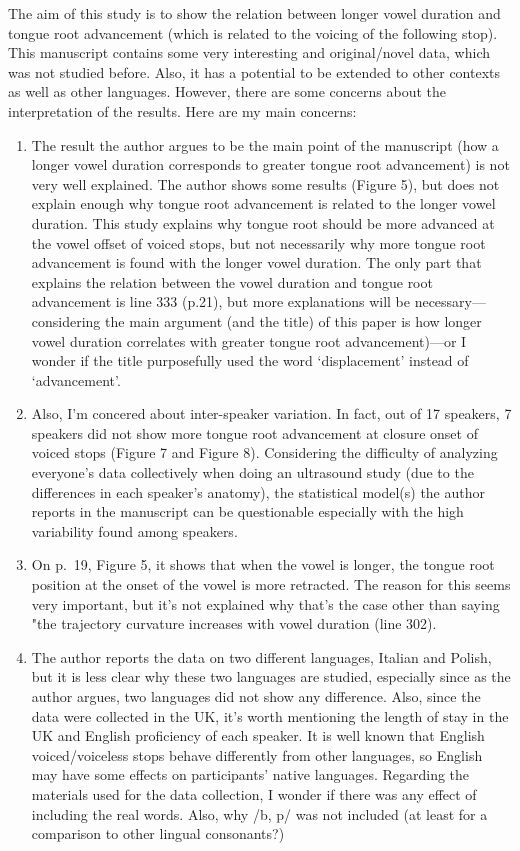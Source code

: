 \documentclass[]{article}
\begin{document}
The aim of this study is to show the relation between longer vowel
duration and tongue root advancement (which is related to the voicing of
the following stop). This manuscript contains some very interesting and
original/novel data, which was not studied before. Also, it has a
potential to be extended to other contexts as well as other languages.
However, there are some concerns about the interpretation of the
results. Here are my main concerns:

\begin{enumerate}
\def\labelenumi{\arabic{enumi}.}
\item
  The result the author argues to be the main point of the manuscript
  (how a longer vowel duration corresponds to greater tongue root
  advancement) is not very well explained. The author shows some results
  (Figure 5), but does not explain enough why tongue root advancement is
  related to the longer vowel duration. This study explains why tongue
  root should be more advanced at the vowel offset of voiced stops, but
  not necessarily why more tongue root advancement is found with the
  longer vowel duration. The only part that explains the relation
  between the vowel duration and tongue root advancement is line 333
  (p.21), but more explanations will be necessary---considering the main
  argument (and the title) of this paper is how longer vowel duration
  correlates with greater tongue root advancement)---or I wonder if the
  title purposefully used the word `displacement' instead of
  `advancement'.
\item
  Also, I'm concered about inter-speaker variation. In fact, out of 17
  speakers, 7 speakers did not show more tongue root advancement at
  closure onset of voiced stops (Figure 7 and Figure 8). Considering the
  difficulty of analyzing everyone's data collectively when doing an
  ultrasound study (due to the differences in each speaker's anatomy),
  the statistical model(s) the author reports in the manuscript can be
  questionable especially with the high variability found among
  speakers.
\item
  On p.~19, Figure 5, it shows that when the vowel is longer, the tongue
  root position at the onset of the vowel is more retracted. The reason
  for this seems very important, but it's not explained why that's the
  case other than saying "the trajectory curvature increases with vowel
  duration (line 302).
\item
  The author reports the data on two different languages, Italian and
  Polish, but it is less clear why these two languages are studied,
  especially since as the author argues, two languages did not show any
  difference. Also, since the data were collected in the UK, it's worth
  mentioning the length of stay in the UK and English proficiency of
  each speaker. It is well known that English voiced/voiceless stops
  behave differently from other languages, so English may have some
  effects on participants' native languages. Regarding the materials
  used for the data collection, I wonder if there was any effect of
  including the real words. Also, why /b, p/ was not included (at least
  for a comparison to other lingual consonants?)
\end{enumerate}
\end{document}
